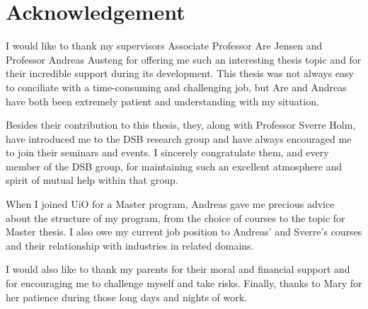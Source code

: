 \chapter*{Acknowledgement}

I would like to thank my supervisors Associate Professor Are Jensen and Professor Andreas Austeng for offering me such an interesting thesis topic and for their incredible support during its development.
This thesis was not always easy to conciliate with a time-consuming and challenging job, but Are and Andreas have both been extremely patient and understanding with my situation.

Besides their contribution to this thesis, they, along with Professor Sverre Holm, have introduced me to the DSB research group and have always encouraged me to join their seminars and events. I sincerely congratulate them, and every member of the DSB group, for maintaining such an excellent atmosphere and spirit of mutual help within that group.

When I joined UiO for a Master program, Andreas gave me precious advice about the structure of my program, from the choice of courses to the topic for Master thesis. I also owe my current job position to Andreas' and Sverre's courses and their relationship with industries in related domains.

I would also like to thank my parents for their moral and financial support and for encouraging me to challenge myself and take risks.
Finally, thanks to Mary for her patience during those long days and nights of work.
